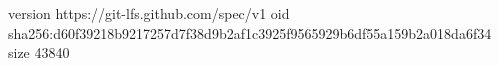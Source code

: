 version https://git-lfs.github.com/spec/v1
oid sha256:d60f39218b9217257d7f38d9b2af1c3925f9565929b6df55a159b2a018da6f34
size 43840
